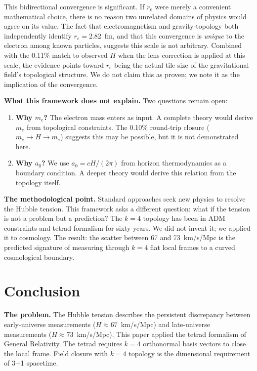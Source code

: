 \documentclass[aps,prd,preprint,superscriptaddress,showpacs,preprintnumbers,amsmath,amssymb,nofootinbib]{revtex4-2}
\begin{document}
This bidirectional convergence is significant. If $r_e$ were merely a convenient mathematical choice, there is no reason two unrelated domains of physics would agree on its value. The fact that electromagnetism and gravity-topology both independently identify $r_e = 2.82$~fm, and that this convergence is \emph{unique} to the electron among known particles, suggests this scale is not arbitrary. Combined with the 0.11\% match to observed $H$ when the lens correction is applied at this scale, the evidence points toward $r_e$ being the actual tile size of the gravitational field's topological structure. We do not claim this as proven; we note it as the implication of the convergence.

\textbf{What this framework does not explain.} Two questions remain open:
\begin{enumerate}
\item \textbf{Why $m_e$?} The electron mass enters as input. A complete theory would derive $m_e$ from topological constraints. The 0.10\% round-trip closure ($m_e \to H \to m_e$) suggests this may be possible, but it is not demonstrated here.
\item \textbf{Why $a_0$?} We use $a_0 = cH/(2\pi)$ from horizon thermodynamics as a boundary condition. A deeper theory would derive this relation from the topology itself.
\end{enumerate}

\textbf{The methodological point.} Standard approaches seek new physics to resolve the Hubble tension. This framework asks a different question: what if the tension is not a problem but a prediction? The $k=4$ topology has been in ADM constraints and tetrad formalism for sixty years. We did not invent it; we applied it to cosmology. The result: the scatter between 67 and 73~km/s/Mpc is the predicted signature of measuring through $k=4$ flat local frames to a curved cosmological boundary.

\section{Conclusion}
\label{sec:conclusion}

\textbf{The problem.} The Hubble tension describes the persistent discrepancy between early-universe measurements ($H \approx 67$~km/s/Mpc) and late-universe measurements ($H \approx 73$~km/s/Mpc). This paper applied the tetrad formalism of General Relativity. The tetrad requires $k=4$ orthonormal basis vectors to close the local frame. Field closure with $k=4$ topology is the dimensional requirement of 3+1 spacetime.
\end{document}
